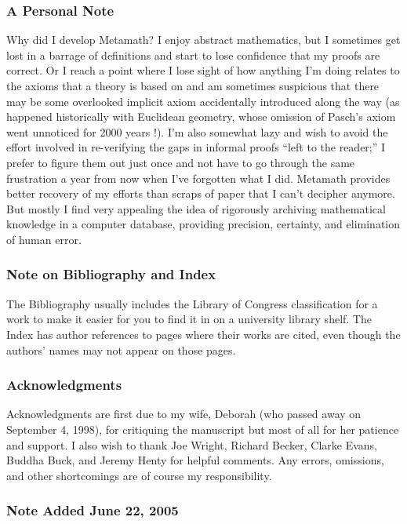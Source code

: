 \subsubsection{A Personal Note}
Why did I develop Metamath?  I enjoy abstract mathematics, but
I sometimes get lost in a barrage of definitions and start to lose confidence
that my proofs are correct.  Or I reach a point where I lose sight of how
anything I'm doing relates to the axioms that a theory is based on and am
sometimes suspicious that there may be some overlooked implicit axiom
accidentally introduced along the way (as happened historically with Euclidean
geometry, whose omission of Pasch's
axiom went unnoticed for 2000 years
\cite[p.~160]{Davis}!). I'm also somewhat lazy and wish to avoid the effort
involved in re-verifying the gaps in informal proofs ``left to the reader;'' I
prefer to figure them out just once and not have to go through the same
frustration a year from now when I've forgotten what I did.  Metamath provides
better recovery of my efforts than scraps of paper that I can't
decipher anymore.  But mostly I find very appealing the idea of rigorously
archiving mathematical knowledge in a computer database, providing precision,
certainty, and elimination of human error.

\subsubsection{Note on Bibliography and Index}

The Bibliography usually includes the Library of Congress classification
for a work to make it easier for you to find it in on a university
library shelf.  The Index has author references to pages where their works
are cited, even though the authors' names may not appear on those pages.

\subsubsection{Acknowledgments}

Acknowledgments are first due to my wife, Deborah (who passed away on
September 4, 1998), for critiquing the manu\-script but most of all for
her patience and support.  I also wish to thank Joe Wright, Richard
Becker, Clarke Evans, Buddha Buck, and Jeremy Henty for helpful
comments.  Any errors, omissions, and other shortcomings are of course
my responsibility.

\subsubsection{Note Added June 22, 2005}\label{note2002}

